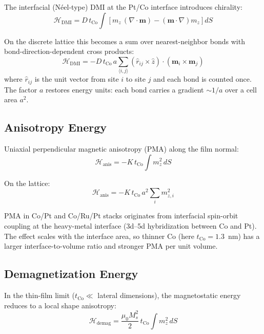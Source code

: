 \documentclass[11pt,a4paper]{article}
\newcommand{\mb}[1]{\mathbf{#1}}
\newcommand{\zhat}{\hat{z}}
\newcommand{\tCo}{t_{\text{Co}}}
\newcommand{\Ms}{M_s}
\begin{document}
The interfacial (N\'{e}el-type) DMI at the Pt/Co interface introduces
chirality:
%
\begin{equation}
\mathcal{H}_{\text{DMI}} = D \, \tCo \int \left[
    m_z \, (\nabla \cdot \mb{m})
    - (\mb{m} \cdot \nabla) m_z
\right] dS
\end{equation}

On the discrete lattice this becomes a sum over nearest-neighbor bonds
with bond-direction-dependent cross products:
%
\begin{equation}
\mathcal{H}_{\text{DMI}} = -D \, \tCo \, a
    \sum_{\langle i,j \rangle}
    (\hat{r}_{ij} \times \zhat) \cdot
    (\mb{m}_i \times \mb{m}_j)
\end{equation}
%
where $\hat{r}_{ij}$ is the unit vector from site $i$ to site $j$
and each bond is counted once.  The factor $a$ restores energy
units: each bond carries a gradient $\sim 1/a$ over a cell area
$a^2$.

\subsection{Anisotropy Energy}

Uniaxial perpendicular magnetic anisotropy (PMA) along the film
normal:
%
\begin{equation}
\mathcal{H}_{\text{anis}} = -K \, \tCo \int m_z^2 \, dS
\end{equation}

On the lattice:
%
\begin{equation}
\mathcal{H}_{\text{anis}} = -K \, \tCo \, a^2 \sum_i m_{z,i}^2
\end{equation}

PMA in Co/Pt and Co/Ru/Pt stacks originates from interfacial
spin-orbit coupling at the heavy-metal interface (3d--5d
hybridization between Co and Pt). The effect scales with the
interface area, so thinner Co (here $\tCo = 1.3$~nm) has a larger
interface-to-volume ratio and stronger PMA per unit volume.

\subsection{Demagnetization Energy}

In the thin-film limit ($\tCo \ll$ lateral dimensions), the
magnetostatic energy reduces to a local shape anisotropy:
%
\begin{equation}
\mathcal{H}_{\text{demag}} = \frac{\mu_0 \Ms^2}{2} \, \tCo
    \int m_z^2 \, dS
\end{equation}
\end{document}
